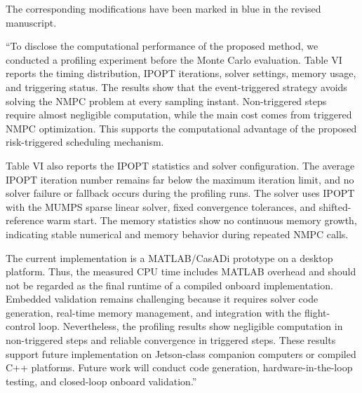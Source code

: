 \documentclass[12pt, twosides]{article}
\theoremstyle{definition}
\begin{document}
The corresponding modifications have been marked in blue in the revised manuscript.
 
 ``To disclose the computational performance of the proposed method, we conducted a profiling experiment before the Monte Carlo evaluation. Table VI reports the timing distribution, IPOPT iterations, solver settings, memory usage, and triggering status. The results show that the event-triggered strategy avoids solving the NMPC problem at every sampling instant. Non-triggered steps require almost negligible computation, while the main cost comes from triggered NMPC optimization. This supports the computational advantage of the proposed risk-triggered scheduling mechanism.
 
 Table VI also reports the IPOPT statistics and solver configuration. The average IPOPT iteration number remains far below the maximum iteration limit, and no solver failure or fallback occurs during the profiling runs. The solver uses IPOPT with the MUMPS sparse linear solver, fixed convergence tolerances, and shifted-reference warm start. The memory statistics show no continuous memory growth, indicating stable numerical and memory behavior during repeated NMPC calls.
 
 The current implementation is a MATLAB/CasADi prototype on a desktop platform. Thus, the measured CPU time includes MATLAB overhead and should not be regarded as the final runtime of a compiled onboard implementation. Embedded validation remains challenging because it requires solver code generation, real-time memory management, and integration with the flight-control loop. Nevertheless, the profiling results show negligible computation in non-triggered steps and reliable convergence in triggered steps. These results support future implementation on Jetson-class companion computers or compiled C++ platforms. Future work will conduct code generation, hardware-in-the-loop testing, and closed-loop onboard validation.''
 
\end{document}
